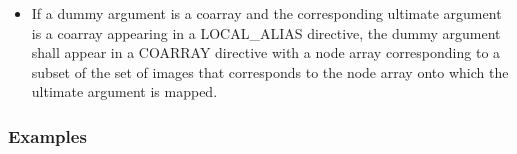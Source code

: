 \begin{itemize}
 \item If a dummy argument is a coarray 
       and the corresponding ultimate argument is a coarray appearing in
       a LOCAL\_ALIAS directive, %
       the dummy argument shall appear in a COARRAY directive
       with a node array corresponding to
       a subset of the set of images that corresponds to the node array
       onto which the ultimate argument is mapped.
%
\end{itemize}

\subsubsection*{Examples}

